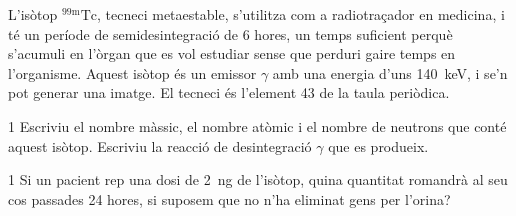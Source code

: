 L'isòtop $^{99\mathrm{m}}\mathrm{Tc}$, tecneci metaestable, s'utilitza com a radiotraçador en medicina, i té un període de semidesintegració de 6 hores, un temps suficient perquè s'acumuli en l'òrgan que es vol estudiar sense que perduri gaire temps en l'organisme. Aquest isòtop és un emissor $\gamma$ amb una energia d'uns 140~keV, i se'n pot generar una imatge. El tecneci és l'element 43 de la taula periòdica.

\begin{apartat}{1}
Escriviu el nombre màssic, el nombre atòmic i el nombre de neutrons que conté aquest isòtop. Escriviu la reacció de desintegració $\gamma$ que es produeix.
\end{apartat}

\begin{apartat}{1}
Si un pacient rep una dosi de 2~ng de l'isòtop, quina quantitat romandrà al seu cos passades 24 hores, si suposem que no n'ha eliminat gens per l'orina?
\end{apartat}
